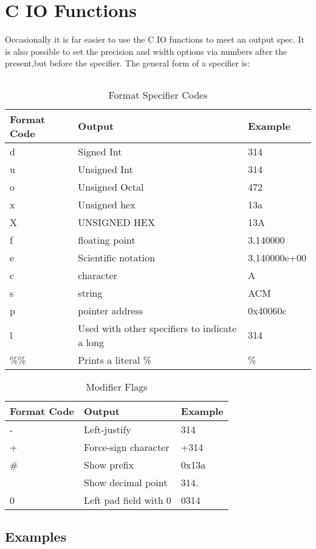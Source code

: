 \section{C IO Functions}
Occasionally it is far easier to use the C IO functions to meet an output spec. It is also possible to set the precision and width options via numbers after the present,but before the specifier.  The general form of a specifier is: 

\begin{lstlisting}[label=format code format,caption=Format Codes for printf()]
%[flags][width][.precision][length]specifier
\end{lstlisting}

\begin{table}[h]
	\caption{Format Specifier Codes\cite{cplusplus}}
	\begin{tabularx}{\textwidth}{|l|X|l|} \hline
		Format Code &   Output              &   Example     \\ \hline
		d           &   Signed Int          &   314         \\
		u           &   Unsigned Int        &   314         \\
		o           &   Unsigned Octal      &   472         \\
		x           &   Unsigned hex        &   13a         \\
		X           &   UNSIGNED HEX        &   13A         \\
		f           &   floating point      &   3.140000    \\
		e           &   Scientific notation &   3.140000e+00\\
		c           &   character           &   A           \\
		s           &   string              &   ACM         \\
		p           &   pointer address     &   0x40060c    \\
		l           &   Used with other specifiers to indicate a long & 314 \\
		\%\%        &   Prints a literal \% &   \%          \\
		\hline
	\end{tabularx}
\end{table}

\begin{table}[h]
	\caption{Modifier Flags \cite{cplusplus}}
	\begin{tabularx}{\textwidth}{|l|X|l|} \hline
		Format Code &   Output                  &   Example    \\ \hline
		-           &   Left-justify            &   314        \\
		+           &   Force-sign character    &   +314       \\
		\#          &   Show prefix             &   0x13a      \\
			  &   Show decimal point      &   314.       \\
		0           &   Left pad field with 0   &   0314       \\
		\hline
	\end{tabularx}
\end{table}

\subsection{Examples}

